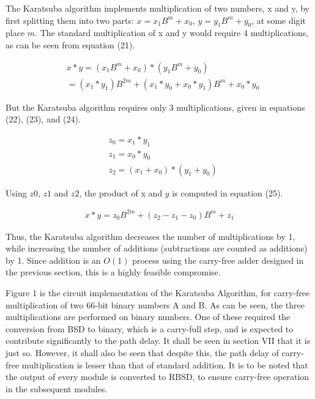 \documentclass[conference]{IEEEtran_NCC}
\begin{document}
The Karatsuba algorithm implements multiplication of two numbers, x and y, by first splitting them into two parts: $x = x_{1}B^{m} + x_{0}$, $y = y_{1}B^{m} + y_{0}$, at some digit place $m$. The standard multiplication of x and y would require 4 multiplications, as can be seen from equation (21).

\vspace{-1em}   
\begin{equation}    
\begin{aligned}   
&x * y = (x_{1}B^{m} + x_{0}) * (y_{1}B^{m} + y_{0})\\    
&= (x_{1} * y_{1})B^{2m} + (x_{1}*y_{0} + x_{0}*y_{1})B^{m} + x_{0}*y_{0}   
\end{aligned}   
\end{equation}

But the Karatsuba algorithm requires only 3 multiplications, given in equations (22), (23), and (24).

\vspace{-1em}
\begin{align}
&z_{0} = x_{1} * y_{1}\\
&z_{1} = x_{0} * y_{0}\\
&z_{2} = (x_{1} + x_{0}) * (y_{1} + y_{0})
\end{align}

Using $z0$, $z1$ and $z2$, the product of x and $y$ is computed in equation (25).

\vspace{-1em}
\begin{align}
x * y = z_{0}B^{2m} + (z_{2} - z_{1} - z_{0})B^{m} + z_{1}
\end{align}

Thus, the Karatsuba algorithm decreases the number of multiplications by 1, while increasing the number of additions (subtractions are counted as additions) by 1. Since addition is an $O(1)$ process using the carry-free adder designed in the previous section, this is a highly feasible compromise.

Figure 1 is the circuit implementation of the Karatsuba Algorithm, for carry-free multiplication of two 66-bit binary numbers A and B. As can be seen, the three multiplications are performed on binary numbers. One of these required the conversion from BSD to binary, which is a carry-full step, and is expected to contribute significantly to the path delay. It shall be seen in section VII that it is just so. However, it shall also be seen that despite this, the path delay of carry-free multiplication is lesser than that of standard addition. It is to be noted that the output of every module is converted to RBSD, to ensure carry-free operation in the subsequent modules.
\end{document}
